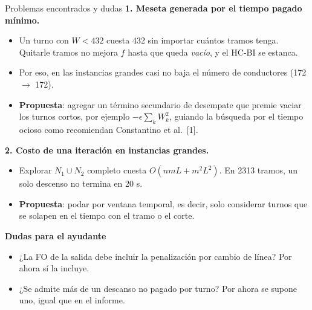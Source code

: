 \documentclass[aspectratio=169,10pt]{beamer}
\begin{document}
\begin{frame}{Problemas encontrados y dudas}
\textbf{1. Meseta generada por el tiempo pagado mínimo.}
\begin{itemize}\small
\item Un turno con $W<432$ cuesta 432 sin importar cuántos tramos tenga. Quitarle tramos no mejora $f$ hasta que queda \emph{vacío}, y el HC-BI se estanca.
\item Por eso, en las instancias grandes casi no baja el número de conductores (172 $\to$ 172).
\item \textbf{Propuesta}: agregar un término secundario de desempate que premie vaciar los turnos cortos, por ejemplo $-\epsilon\sum_k W_k^2$, guiando la búsqueda por el tiempo ocioso como recomiendan Constantino et al.~[1].
\end{itemize}
\textbf{2. Costo de una iteración en instancias grandes.}
\begin{itemize}\small
\item Explorar $N_1\cup N_2$ completo cuesta $O(nmL + m^2L^2)$. En 2313 tramos, un solo descenso no termina en 20 s.
\item \textbf{Propuesta}: podar por ventana temporal, es decir, solo considerar turnos que se solapen en el tiempo con el tramo o el corte.
\end{itemize}
\textbf{Dudas para el ayudante}
\begin{itemize}\small
\item ¿La FO de la salida debe incluir la penalización por cambio de línea? Por ahora sí la incluye.
\item ¿Se admite más de un descanso no pagado por turno? Por ahora se supone uno, igual que en el informe.
\end{itemize}
\end{frame}
\end{document}

